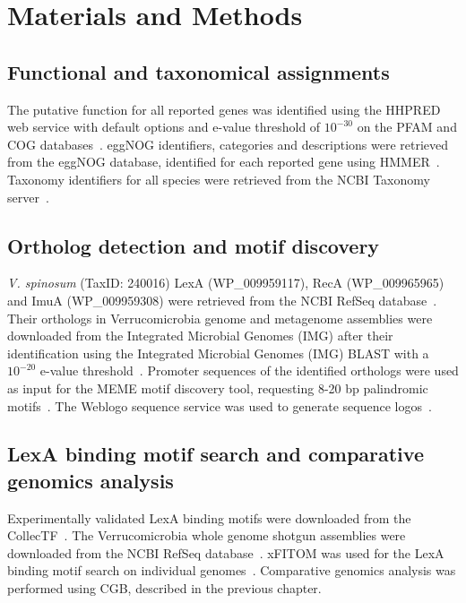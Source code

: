 \section{Materials and Methods}

\subsection{Functional and taxonomical assignments}
The putative function for all reported genes was identified using the HHPRED
web service with default options and e-value threshold of $10^{-30}$ on the
PFAM and COG databases~\citep{soding2005hhpred, finn2015pfam,
  tatusov2000cog}. eggNOG identifiers, categories and descriptions were
retrieved from the eggNOG database, identified for each reported gene using
HMMER~\citep{powell2013eggnog, eddy2011accelerated}. Taxonomy identifiers for
all species were retrieved from the NCBI Taxonomy
server~\citep{federhen2012ncbi}.

\subsection{Ortholog detection and motif discovery}
\textit{V. spinosum} (TaxID: 240016) LexA (WP\_009959117), RecA (WP\_009965965)
and ImuA \mbox{(WP\_009959308)} were retrieved from the NCBI RefSeq
database~\citep{pruitt2007ncbi}. Their orthologs in Verrucomicrobia genome and
metagenome assemblies were downloaded from the Integrated Microbial Genomes
(IMG) after their identification using the Integrated Microbial Genomes (IMG)
BLAST with a $10^{-20}$ e-value threshold~\citep{markowitz2012img,
  altschul1997gapped}. Promoter sequences of the identified orthologs were used
as input for the MEME motif discovery tool, requesting 8-20 bp palindromic
motifs~\citep{bailey2015meme}. The Weblogo sequence service was used to generate
sequence logos~\citep{crooks2004weblogo}.

\subsection{LexA binding motif search and comparative genomics analysis}
Experimentally validated LexA binding motifs were downloaded from the
CollecTF~\citep{kilic2013collectf}. The Verrucomicrobia whole genome shotgun
assemblies were downloaded from the NCBI RefSeq
database~\citep{o2015reference}. xFITOM was used for the LexA binding motif
search on individual genomes~\citep{bhargava2010xfitom}. Comparative genomics
analysis was performed using CGB, described in the previous chapter.

